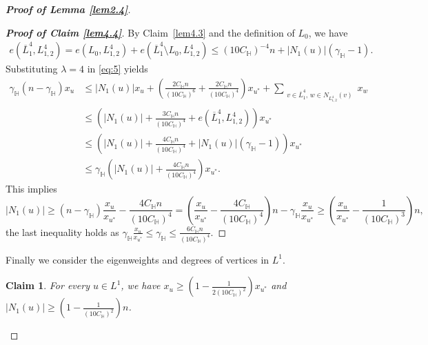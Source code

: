 \documentclass[11pt, a4paper]{article}
\newtheorem{claim}[theorem]{Claim}
\theoremstyle{definition}
\newcommand{\<}{\subseteq}
\begin{document}
\begin{proof}[\bf Proof of Lemma \ref{lem2.4}]
\begin{proof}[\bf Proof of Claim \ref{lem4.4}]
    By Claim~\ref{lem4.3} and the definition of $L_0$, we have %
    \begin{align}\label{eq:10}
        e(\overline{L}_1^4, L_{1,2}^4) =e(L_0, L_{1,2}^4)+e(\overline{L}_1^4\setminus L_0, L_{1,2}^4) \leq (10C_\mathbb{H})^{-4}n+|N_1(u)|(\gamma_\mathbb{H}-1).
    \end{align}
    Substituting \(\lambda = 4\) in 
    \eqref{eq:5} yields \allowdisplaybreaks
    \begin{align*}
    \gamma_\mathbb{H}(n-\gamma_\mathbb{H})x_u &\leq |N_1(u)|x_u + \left( \frac{2C_\mathbb{H}n}{(10C_\mathbb{H})^{6}} + \frac{2C_\mathbb{H}n}{(10C_\mathbb{H})^4} \right)x_{u^*} + \sum_{\substack{v \in \overline{L}_1^4,\,w \in N_{L_{1,2}^4}(v)}} x_w\\
    &\leq \left(|N_1(u)| +  \frac{3C_\mathbb{H}n}{(10C_\mathbb{H})^{4}}+e(\overline{L}_1^4, L_{1,2}^4)\right)x_{u^*}\\
    &\leq \left(|N_1(u)| +  \frac{4C_\mathbb{H}n}{(10C_\mathbb{H})^{4}}+|N_1(u)|(\gamma_\mathbb{H}-1)\right)x_{u^*}\\
    &\leq \gamma_{\mathbb{H}}\left(|N_1(u)| +  \frac{4C_\mathbb{H}n}{(10C_\mathbb{H})^{4}}\right)x_{u^*}.
    \end{align*}
    This implies 
    \[
    |N_1(u)| \geq (n-\gamma_{\mathbb{H}})\frac{x_u}{x_{u^*}}-\frac{4C_\mathbb{H}n}{(10C_\mathbb{H})^{4}}=\left(\frac{x_u}{x_{u^*}}-\frac{4C_\mathbb{H}}{(10C_\mathbb{H})^{4}}\right)n-\gamma_{\mathbb{H}}\frac{x_u}{x_{u^*}}\geq \left(\frac{x_u}{x_{u^*}}-\frac{1}{(10C_\mathbb{H})^{3}}\right)n, 
    \]
    the last inequality holds as $\gamma_{\mathbb{H}}\frac{x_u}{x_{u^*}}\leq \gamma_{\mathbb{H}}\leq \frac{6C_\mathbb{H}n}{(10C_\mathbb{H})^{4}}$. 
\end{proof}

     Finally we consider the eigenweights and degrees of vertices in $L^1$. 
    
\begin{claim}\label{lem4.5}
    For every \( u \in L^1 \), we have
    $x_u \geq \left(1-\frac{1}{2(10C_\mathbb{H})^2}\right)x_{u^*}$ and $|N_1(u)| \geq \left(1-\frac{1}{(10C_\mathbb{H})^2}\right)n$.
    \end{claim}


\end{proof}
\end{document}

